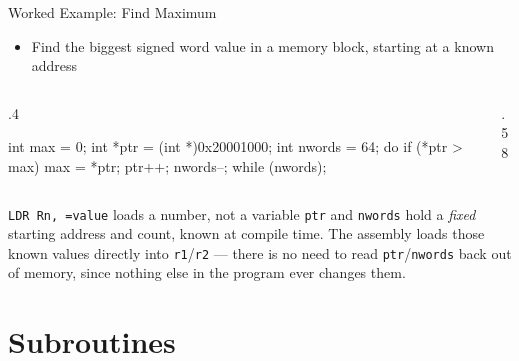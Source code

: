 \documentclass[9pt,aspectratio=169,xcolor=table]{beamer}
\begin{document}
\begin{frame}[fragile]{Worked Example: Find Maximum}
    \begin{itemize}
        \item Find the biggest signed word value in a memory block, starting at a known address
    \end{itemize}

    \vspace{1mm}
    \begin{columns}[T]
    \begin{column}{.4\textwidth}
        \begin{cc}
int max = 0;
int *ptr = (int *)0x20001000;
int nwords = 64;
do {
    if (*ptr > max)
        max = *ptr;
    ptr++;
    nwords--;
} while (nwords);
\end{cc}
    \end{column}
    \begin{column}{.58\textwidth}
    \end{column}
    \end{columns}

    \vspace{2mm}
    \begin{block}{\texttt{LDR Rn, =value} loads a number, not a variable}
        \texttt{ptr} and \texttt{nwords} hold a \emph{fixed} starting
        address and count, known at compile time. The assembly loads
        those known values directly into \texttt{r1}/\texttt{r2} ---
        there is no need to read \texttt{ptr}/\texttt{nwords} back out
        of memory, since nothing else in the program ever changes them.
    \end{block}
\end{frame}


\section{Subroutines}
\end{document}
